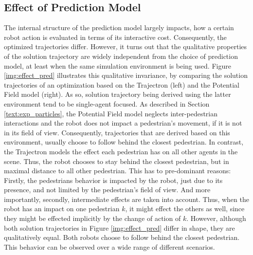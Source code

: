\subsection{Effect of Prediction Model}
The internal structure of the prediction model largely impacts, how a certain robot action is evaluated in terms of its interactive cost. Consequently, the optimized trajectories differ. However, it turns out that the qualitative properties of the solution trajectory are widely independent from the choice of prediction model, at least when the same simulation environment is being used. Figure \ref{img:effect_pred} illustrates this qualitative invariance, by comparing the solution trajectories of an optimization based on the Trajectron \cite{Ivanovic2018} (left) and the Potential Field model (right). As so, solution trajectory being derived using the latter environment tend to be single-agent focused. As described in Section \ref{text:exp_particles}, the Potential Field model neglects inter-pedestrian interactions and the robot does not impact a pedestrian's movement, if it is not in its field of view. Consequently, trajectories that are derived based on this environment, usually choose to follow behind the closest pedestrian. In contrast, the Trajectron models the effect each pedestrian has on all other agents in the scene. Thus, the robot chooses to stay behind the closest pedestrian, but in maximal distance to all other pedestrian. This has to pre-dominant reasons: Firstly, the pedestrians behavior is impacted by the robot, just due to its presence, and not limited by the pedestrian's field of view. And more importantly, secondly, intermediate effects are taken into account. Thus, when the robot has an impact on one pedestrian $k$, it might effect the others as well, since they might be effected implicitly by the change of action of $k$. 
\newline
However, although both solution trajectories in Figure \ref{img:effect_pred} differ in shape, they are qualitatively equal. Both robots choose to follow behind the closest pedestrian. This behavior can be observed over a wide range of different scenarios.

